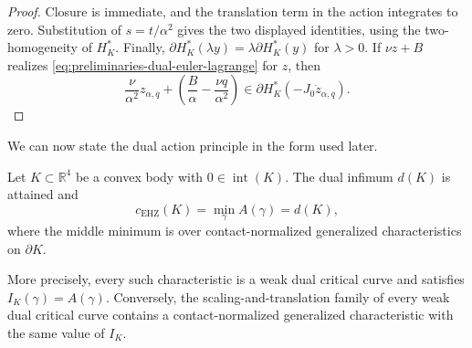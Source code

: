 \begin{proof}
Closure is immediate, and the translation term in the action integrates to
zero.  Substitution of \(s=t/\alpha^2\) gives the two displayed identities,
using the two-homogeneity of \(H_K^*\).  Finally,
\(\partial H_K^*(\lambda y)=\lambda\partial H_K^*(y)\) for \(\lambda>0\).
If \(\nu z+B\) realizes \eqref{eq:preliminaries-dual-euler-lagrange} for
\(z\), then
\[
  \frac{\nu}{\alpha^2}z_{\alpha,q}
  +\left(\frac{B}{\alpha}-\frac{\nu q}{\alpha^2}\right)
  \in\partial H_K^*(-J_0\dot z_{\alpha,q}).
\]
\end{proof}

We can now state the dual action principle in the form used later.

\begin{theorem}
\label{thm:preliminaries-clarke-dual-action}
Let \(K\subset\mathbb R^4\) be a convex body with
\(0\in\operatorname{int}(K)\).  The dual infimum \(d(K)\) is attained and
\[
  c_{\mathrm{EHZ}}(K)
  =\min_\gamma A(\gamma)
  =d(K),
\]
where the middle minimum is over contact-normalized generalized
characteristics on \(\partial K\).

More precisely, every such characteristic is a weak dual critical curve and
satisfies \(I_K(\gamma)=A(\gamma)\).  Conversely, the scaling-and-translation
family of every weak dual critical curve contains a contact-normalized
generalized characteristic with the same value of \(I_K\).
\end{theorem}

